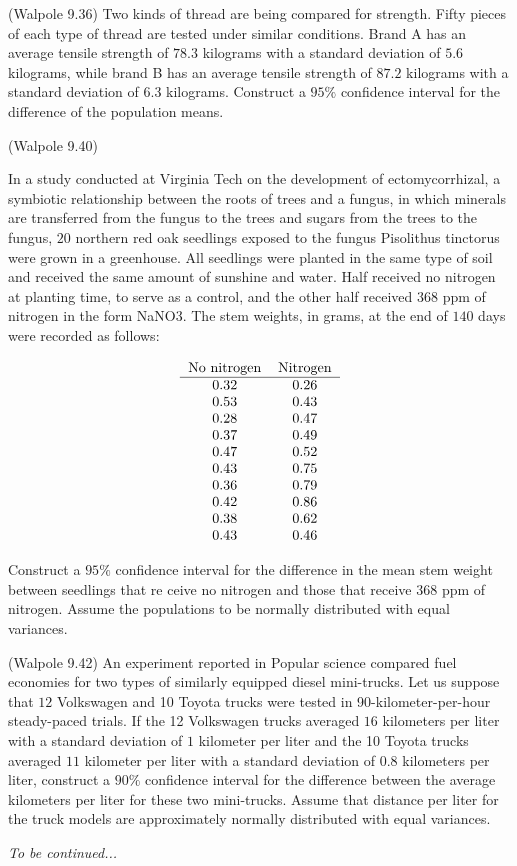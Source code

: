 \documentclass[14pt]{exam}
\begin{document}
\begin{questions}
		\question
		(Walpole 9.36)
		Two kinds of thread are being compared for strength. Fifty pieces of each type of thread are tested under similar conditions. Brand A has an average tensile strength of $78.3$ kilograms with a standard deviation of $5.6$ kilograms, while brand B has an average tensile strength of $87.2$ kilograms with a standard deviation of $6.3$ kilograms. Construct a $95\%$ confidence interval for the difference of the population means.
		
		\question
		(Walpole 9.40)
		
		In a study conducted at Virginia Tech on the development of ectomycorrhizal, a symbiotic relationship between the roots of trees and a fungus, in which minerals are transferred from the fungus to the trees and sugars from the trees to the fungus, $20$ northern red oak seedlings exposed to the fungus Pisolithus tinctorus were grown in a greenhouse. All seedlings were planted in the same type of soil and received the same amount of sunshine and water. Half received no nitrogen at planting time, to serve as a control, and the other half received $368$ ppm of nitrogen in the form NaNO3. The stem weights, in grams, at the end of $140$ days were recorded as follows:
		
		$$
			\begin{tabular}{cc}
				No nitrogen & Nitrogen\\ \hline
				0.32 & 0.26\\
				0.53 & 0.43\\
				0.28 & 0.47\\
				0.37 & 0.49\\
				0.47 & 0.52\\
				0.43 & 0.75\\
				0.36 & 0.79\\
				0.42 & 0.86\\
				0.38 & 0.62\\
				0.43 & 0.46
			\end{tabular}
		$$
		
		Construct a $95\%$ confidence interval for the difference in the mean stem weight between seedlings that re ceive no nitrogen and those that receive $368$ ppm of nitrogen. Assume the populations to be normally distributed with equal variances.
		
		\question
		(Walpole 9.42)
		An experiment reported in Popular science compared fuel economies for two types of similarly equipped diesel mini-trucks. Let us suppose that $12$ Volkswagen and 10 Toyota trucks were tested in 90-kilometer-per-hour steady-paced trials. If the 12 Volkswagen trucks averaged $16$ kilometers per liter with a standard deviation of $1$ kilometer per liter and the 10 Toyota trucks averaged $11$ kilometer per liter with a standard deviation of $0.8$ kilometers per liter, construct a $90\%$ confidence interval for the difference between the average kilometers per liter for these two mini-trucks. Assume that distance per liter for the truck models are approximately normally distributed with equal variances.
	\end{questions}


	\textit{To be continued...}
	
\end{document}
